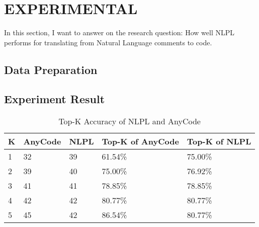 \chapter{EXPERIMENTAL}
In this section, I want to answer on the research question: How well NLPL performs for translating from Natural Language comments to code.  
\section{Data Preparation}

\section{Experiment Result}

\begin{table}[]
	
	\centering
	\begin{tabular}{|l|l|l|l|l|}
		\hline
		\textbf{K} & \textbf{AnyCode} & \textbf{NLPL} & \textbf{Top-K of AnyCode} & \textbf{Top-K of NLPL} \\ \hline
		1              & 32               & 39            & 61.54\%                   & 75.00\%                \\ \hline
		2              & 39               & 40            & 75.00\%                   & 76.92\%                \\ \hline
		3              & 41               & 41            & 78.85\%                   & 78.85\%                \\ \hline
		4              & 42               & 42            & 80.77\%                   & 80.77\%                \\ \hline
		5              & 45               & 42            & 86.54\%                   & 80.77\%                \\ \hline
	\end{tabular}
 \caption{Top-K Accuracy of NLPL and AnyCode}
\label{table:TopKAccuracy} 
\end{table}

